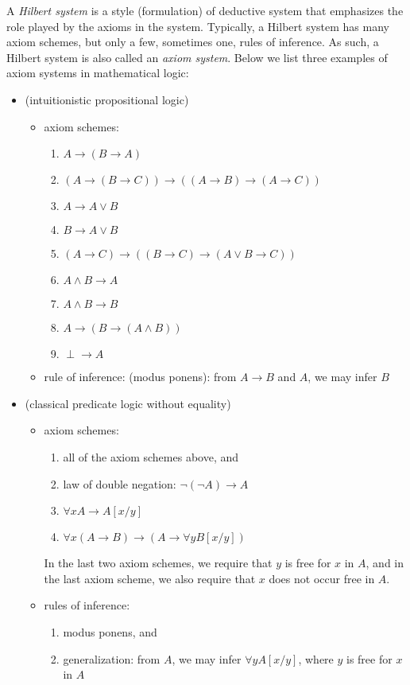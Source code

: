 \documentclass[12pt]{article}
\begin{document}
A \emph{Hilbert system} is a style (formulation) of deductive system that emphasizes the role played by the axioms in the system.  Typically, a Hilbert system has many axiom schemes, but only a few, sometimes one, rules of inference.  As such, a Hilbert system is also called an \emph{axiom system}.  Below we list three examples of axiom systems in mathematical logic:

\begin{itemize}
\item (intuitionistic propositional logic)
\begin{itemize}
\item axiom schemes:
\begin{enumerate}
\item $A\to (B\to A)$
\item $(A\to (B\to C))\to ((A\to B)\to (A\to C))$
\item $A\to A\vee B$ 
\item $B\to A\vee B$
\item $(A\to C)\to ((B\to C)\to (A\vee B\to C))$
\item $A\wedge B \to A$
\item $A\wedge B \to B$
\item $A \to (B\to (A\wedge B))$
\item $\perp \to A$
\end{enumerate}
\item rule of inference: (modus ponens): from $A\to B$ and $A$, we may infer $B$
\end{itemize}
\item (classical predicate logic without equality)
\begin{itemize}
\item axiom schemes:
\begin{enumerate}
\item all of the axiom schemes above, and 
\item law of double negation: $\neg (\neg A) \to A$
\item $\forall x A \to A[x/y]$
\item $\forall x (A\to B) \to (A \to \forall y B[x/y])$
\end{enumerate}
In the last two axiom schemes, we require that $y$ is free for $x$ in $A$, and in the last axiom scheme, we also require that $x$ does not occur free in $A$.
\item rules of inference: 
\begin{enumerate}
\item modus ponens, and
\item generalization: from $A$, we may infer $\forall y A[x/y]$, where $y$ is free for $x$ in $A$

\end{enumerate}
\end{itemize}
\end{itemize}
\end{document}
